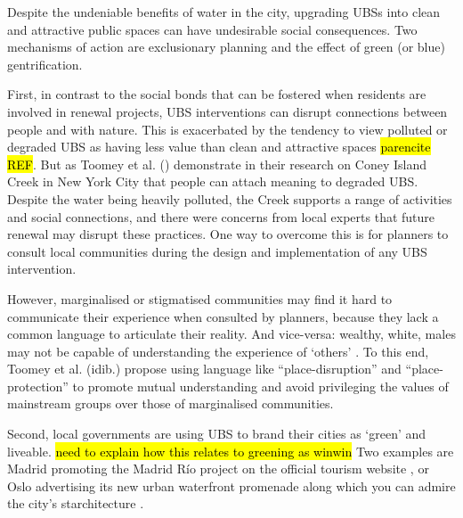 \documentclass{article}
\begin{document}
Despite the undeniable benefits of water in the city, upgrading UBSs into clean and attractive public spaces can have undesirable social consequences.
Two mechanisms of action are exclusionary planning and the effect of green (or blue) gentrification.

First, in contrast to the social bonds that can be fostered when residents are involved in renewal projects, UBS interventions can disrupt connections between people and with nature.
This is exacerbated by the tendency to view polluted or degraded UBS as having less value than clean and attractive spaces \hl{parencite REF}. 
But as Toomey et al. (\citeyear{toomey2021place}) demonstrate in their research on Coney Island Creek in New York City that people can attach meaning to degraded UBS. Despite the water being heavily polluted, the Creek supports a range of activities and social connections, and there were concerns from local experts that future renewal may disrupt these practices. One way to overcome this is for planners to consult local communities during the design and implementation of any UBS intervention.

However, marginalised or stigmatised communities may find it hard to communicate their experience when consulted by planners, because they lack a common language to articulate their reality. And vice-versa: wealthy, white, males may not be capable of understanding the experience of `others' \parencite{anguelovski2020expanding}. To this end, Toomey et al. (idib.) propose using language like ``place-disruption'' and ``place-protection'' to promote mutual understanding and avoid privileging the values of mainstream groups over those of marginalised communities.

Second, local governments are using UBS to brand their cities as `green' and liveable.
\hl{need to explain how this relates to greening as winwin} Two examples are Madrid promoting the Madrid Río project on the official tourism website \parencite{madridrio}, or Oslo advertising its new urban waterfront promenade along which you can admire the city's starchitecture \parencite{visitoslo}.
\end{document}
